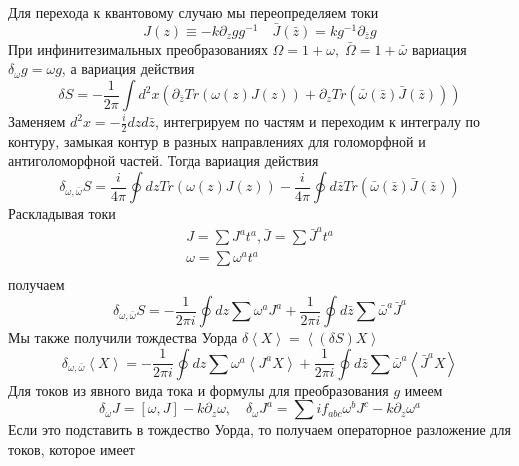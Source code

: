 \documentclass[a4paper,12pt]{article}
\theoremstyle{definition} \newtheorem{Def}{Definition}
\begin{document}
Для перехода к квантовому случаю мы переопределяем токи
\begin{equation}
  \label{eq:82}
  J(z)\equiv -k \partial_zg g^{-1}\quad \bar J(\bar z)=k g^{-1}\partial_{\bar z}g
\end{equation}
 При инфинитезимальных преобразованиях $\Omega=1+\omega,\; \bar \Omega =1+\bar \omega$ вариация
 $\delta_{\omega}g=\omega g$, а вариация действия
 \begin{equation}
   \label{eq:11}
   \delta S=-\frac{1}{2\pi}\int d^2 x \left(\partial_{\bar z}Tr(\omega(z)J(z))+\partial_z Tr(\bar
     \omega(\bar z)\bar J(\bar z))\right)
 \end{equation}
Заменяем $d^2 x=-\frac{i}{2} dz d\bar z$, интегрируем по частям и переходим к интегралу по контуру, замыкая
контур в разных направлениях для голоморфной и антиголоморфной частей.
Тогда вариация действия
\begin{equation}
  \label{eq:83}
  \delta_{\omega,\bar\omega}S=\frac{i}{4\pi}\oint dz Tr (\omega(z)J(z))-\frac{i}{4\pi}\oint d\bar z Tr(\bar\omega(\bar z)\bar J(\bar z))
\end{equation}
Раскладывая токи
\begin{equation}
  \label{eq:85}
  \begin{aligned}
    J=\sum J^a t^a,\bar J=\sum \bar J^a t^a \\
    \omega=\sum \omega^a t^a\\
  \end{aligned}
\end{equation}
получаем
\begin{equation}
  \label{eq:86}
  \delta_{\omega,\bar \omega}S=-\frac{1}{2\pi i}\oint dz \sum\omega^a J^a+\frac{1}{2\pi i} \oint d\bar z \sum \bar \omega^a \bar J^a
\end{equation}
Мы также получили тождества Уорда $\delta\left< X\right>=\left<(\delta S)X\right>$
\begin{equation}
  \label{eq:87}
  \delta_{\omega,\bar \omega}\left< X \right>=-\frac{1}{2\pi i}\oint dz \sum\omega^a \left< J^a X\right>+
  \frac{1}{2\pi i} \oint d\bar z \sum \bar \omega^a \left< \bar J^a X\right>
\end{equation}
Для токов из явного вида тока и формулы для преобразования $g$ имеем
\begin{equation}
  \label{eq:88}
  \delta_{\omega}J=[\omega,J]-k\partial_z\omega,\quad \delta_{\omega}J^a=\sum i f_{abc}\omega^b J^c-k\partial_z\omega^a
\end{equation}
Если это подставить в тождество Уорда, то получаем операторное разложение для токов, которое имеет
\end{document}
